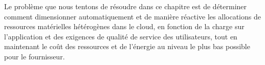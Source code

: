 
Le problème que nous tentons de résoudre dans ce chapitre est de déterminer comment dimensionner automatiquement et de manière réactive les allocations de ressources matérielles hétérogènes dans le cloud, en fonction de la charge sur l'application et des exigences de qualité de service des utilisateurs, tout en maintenant le coût des ressources et de l'énergie au niveau le plus bas possible pour le fournisseur.

